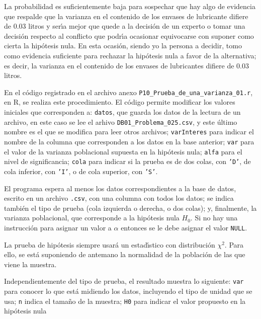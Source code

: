 \begin{solucion}
 \begin{conclusion}
  La probabilidad es suficientemente baja para sospechar que hay algo de evidencia
  que respalde que la varianza en el contenido de los envases de lubricante difiere
  de $0.03$ litros y ser\'{\i}a mejor que quede a la decisi\'on de un experto o
  tomar una decisi\'on respecto al conflicto que podr\'{\i}a ocasionar equivocarse
  con suponer como cierta la hip\'otesis nula.
  En esta ocasi\'on, siendo yo la persona a decidir,
  tomo como evidencia suficiente para rechazar la hip\'otesis nula
  a favor de la alternativa;
  es decir, la varianza en el contenido de los envases de lubricantes difiere
  de $0.03$ litros.
 \end{conclusion}

 En el c\'odigo registrado en el archivo anexo
 \texttt{P10\_Prueba\_de\_una\_varianza\_01.r}, en R,
 se realiza este procedimiento.
 El c\'odigo permite modificar los valores iniciales
 que corresponden a:
 \texttt{datos}, que guarda los datos de la lectura
 de un archivo,
 en este caso se lee el arhivo \texttt{DB01\_Problema\_025.csv},
 y este \'ultimo nombre es el que se modifica 
 para leer otros archivos;
 \texttt{varInteres} para indicar el nombre de la columna
 que corresponden a los datos en la base anterior;
 \texttt{var} para el valor de la varianza poblacional supuesta
 en la hip\'otesis nula;
 \texttt{alfa} para el nivel de significancia;
 \texttt{cola} para indicar si la prueba es de dos colas,
 con \texttt{'D'}, de cola inferior, con \texttt{'I'},
 o de cola superior, con \texttt{'S'}.
 \par 
 El programa espera al menos los datos correspondientes
 a la base de datos, escrito en un archivo \texttt{.csv},
 con una columna con todos los datos;
 se indica tambi\'en el tipo de prueba (cola izquierda o derecha,
 o dos colas);
 y, finalmente, la varianza poblacional,
 que corresponde a la hip\'otesis nula $H_0$.
 Si no hay una instrucci\'on para asignar un valor a $\alpha$
 entonces se le debe asignar el valor \texttt{NULL}.
 \par 
 La prueba de hip\'otesis siempre usar\'a un estad\'{\i}stico
 con distribuci\'on $\chi^2$.
 Para ello, se est\'a suponiendo de antemano la normalidad
 de la poblaci\'on de las que viene la muestra.
 \par 
 Independientemente del tipo de prueba, el resultado muestra lo siguiente:
 \texttt{var} para conocer lo que est\'a midiendo los datos,
 incluyendo el tipo de unidad que se usa;
 \texttt{n} indica el tama\~no de la muestra;
 \texttt{H0} para indicar el valor propuesto en la hip\'otesis nula

\end{solucion}
